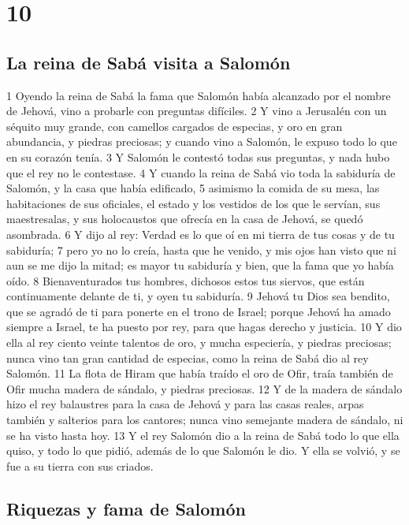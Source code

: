 \chapter{10}

\section*{La reina de Sabá visita a Salomón}

1 Oyendo la reina de Sabá la fama que Salomón había alcanzado por el nombre de Jehová, vino a probarle con preguntas difíciles.
2 Y vino a Jerusalén con un séquito muy grande, con camellos cargados de especias, y oro en gran abundancia, y piedras preciosas; y cuando vino a Salomón, le expuso todo lo que en su corazón tenía.
3 Y Salomón le contestó todas sus preguntas, y nada hubo que el rey no le contestase.
4 Y cuando la reina de Sabá vio toda la sabiduría de Salomón, y la casa que había edificado,
5 asimismo la comida de su mesa, las habitaciones de sus oficiales, el estado y los vestidos de los que le servían, sus maestresalas, y sus holocaustos que ofrecía en la casa de Jehová, se quedó asombrada.
6 Y dijo al rey: Verdad es lo que oí en mi tierra de tus cosas y de tu sabiduría;
7 pero yo no lo creía, hasta que he venido, y mis ojos han visto que ni aun se me dijo la mitad; es mayor tu sabiduría y bien, que la fama que yo había oído.
8 Bienaventurados tus hombres, dichosos estos tus siervos, que están continuamente delante de ti, y oyen tu sabiduría.
9 Jehová tu Dios sea bendito, que se agradó de ti para ponerte en el trono de Israel; porque Jehová ha amado siempre a Israel, te ha puesto por rey, para que hagas derecho y justicia.
10 Y dio ella al rey ciento veinte talentos de oro,  y mucha especiería, y piedras preciosas; nunca vino tan gran cantidad de especias, como la reina de Sabá dio al rey Salomón.
11 La flota de Hiram que había traído el oro de Ofir, traía también de Ofir mucha madera de sándalo, y piedras preciosas.
12 Y de la madera de sándalo hizo el rey balaustres para la casa de Jehová y para las casas reales, arpas también y salterios para los cantores; nunca vino semejante madera de sándalo, ni se ha visto hasta hoy.
13 Y el rey Salomón dio a la reina de Sabá todo lo que ella quiso, y todo lo que pidió, además de lo que Salomón le dio. Y ella se volvió, y se fue a su tierra con sus criados.

\section*{Riquezas y fama de Salomón}

